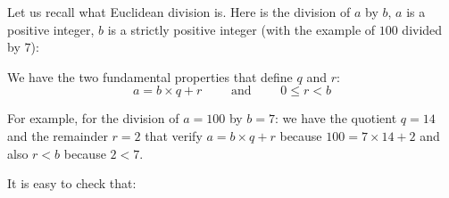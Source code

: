 \documentclass[11pt,class=report,crop=false]{standalone}
\begin{document}





\begin{cours}[Arithmetic]

\index{\ci{//}}
\index{\ci{\%}}

Let us recall what Euclidean division is. Here is the division of $a$ by $b$, $a$ is a positive integer, $b$ is a strictly positive integer (with the example of $100$ divided by $7$):


We have the two fundamental properties that define $q$ and $r$:
$$a = b \times q  + r \qquad \text{ and } \qquad 0 \le r < b$$

For example, for the division of $a=100$ by $b=7$: we have the quotient $q=14$ and the remainder $r=2$ that verify $a = b \times q  + r$ because $100 = 7 \times 14 + 2$ and also $r<b$ because $2<7$.


It is easy to check that:

\end{cours}


\end{document}
